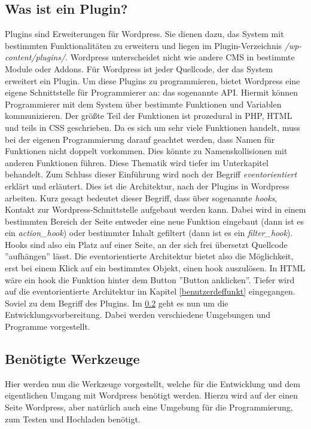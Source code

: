 \subsection{Was ist ein Plugin?}\label{WIEP}
Plugins sind Erweiterungen für Wordpress. Sie dienen dazu, das System mit bestimmten Funktionalitäten zu erweitern und liegen im Plugin-Verzeichnis \emph{/wp-content/plugins/}. Wordpress unterscheidet  nicht wie andere CMS in bestimmte Module oder Addons. Für Wordpress ist jeder Quellcode, der das System erweitert ein Plugin.\newline
Um diese Plugins zu programmieren, bietet Wordpress eine eigene Schnittstelle für Programmierer an: das sogenannte \gls{API}.
Hiermit können Programmierer mit dem System über bestimmte Funktionen und Variablen kommunizieren. Der größte Teil der Funktionen ist prozedural in \gls{PHP}, \gls{HTML} und teils in \gls{CSS} geschrieben.  
Da es sich um sehr viele Funktionen handelt, muss bei der eigenen Programmierung darauf geachtet werden, dass Namen für Funktionen nicht doppelt vorkommen. Dies könnte zu Namenskollisionen mit anderen Funktionen führen. Diese Thematik wird tiefer im Unterkapitel  behandelt.\newline
Zum Schluss dieser Einführung wird noch der Begriff \emph{eventorientiert} erklärt und erläutert. Dies ist die Architektur, nach der Plugins in Wordpress arbeiten.\newline
Kurz gesagt bedeutet dieser Begriff, dass über sogenannte \emph{hooks}, Kontakt zur Wordpress-Schnittstelle aufgebaut werden kann. Dabei wird in einem bestimmten Bereich der Seite entweder eine neue Funktion eingebaut (dann ist es ein \emph{action\_hook}) oder bestimmter Inhalt gefiltert (dann ist es ein \emph{filter\_hook}).\newline
Hooks sind also ein Platz auf einer Seite, an der sich frei übersetzt Quellcode ''aufhängen'' lässt. Die eventorientierte Architektur bietet also die Möglichkeit, erst bei einem Klick auf ein bestimmtes Objekt, einen hook auszulösen. In HTML wäre ein hook die Funktion hinter dem Button ''Button anklicken''. Tiefer wird auf die eventorientierte Architektur im Kapitel \ref{benutzerdeffunkt} eingegangen.\newline
Soviel zu dem Begriff des Plugins. Im \ref{BEWE} geht es nun um die Entwicklungsvorbereitung. Dabei werden verschiedene Umgebungen und Programme vorgestellt. 
\subsection{Benötigte Werkzeuge}\label{BEWE}
Hier werden nun die Werkzeuge vorgestellt, welche für die Entwicklung und dem eigentlichen Umgang mit Wordpress benötigt werden. Hierzu wird auf der einen Seite Wordpress, aber natürlich auch eine Umgebung für die Programmierung, zum Testen und Hochladen benötigt.
